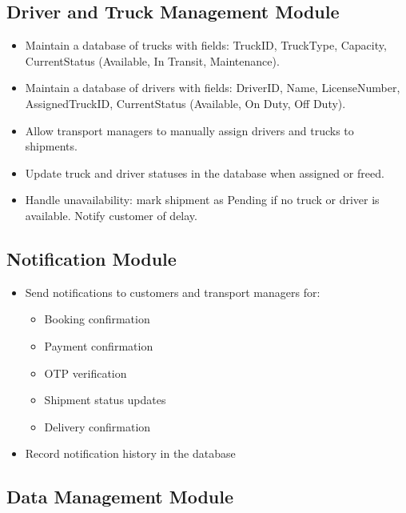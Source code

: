 \documentclass[12pt,a4paper]{article}
\begin{document}
\subsection{Driver and Truck Management Module}

\begin{itemize}

\item Maintain a database of trucks with fields: TruckID, TruckType, Capacity, CurrentStatus (Available, In Transit, Maintenance).
\item  Maintain a database of drivers with fields: DriverID, Name, LicenseNumber, AssignedTruckID, CurrentStatus (Available, On Duty, Off Duty).
\item  Allow transport managers to manually assign drivers and trucks to shipments.
\item  Update truck and driver statuses in the database when assigned or freed.
\item  Handle unavailability: mark shipment as Pending if no truck or driver is available. Notify customer of delay.


\end{itemize}

\subsection{Notification Module}

\begin{itemize}

\item Send notifications to customers and transport managers for:
    \begin{itemize}
    \item Booking confirmation
      \item Payment confirmation
       \item OTP verification
     \item Shipment status updates
      \item Delivery confirmation

    \end{itemize}
\item Record notification history in the database
\end{itemize}

\subsection{Data Management Module}
\end{document}
